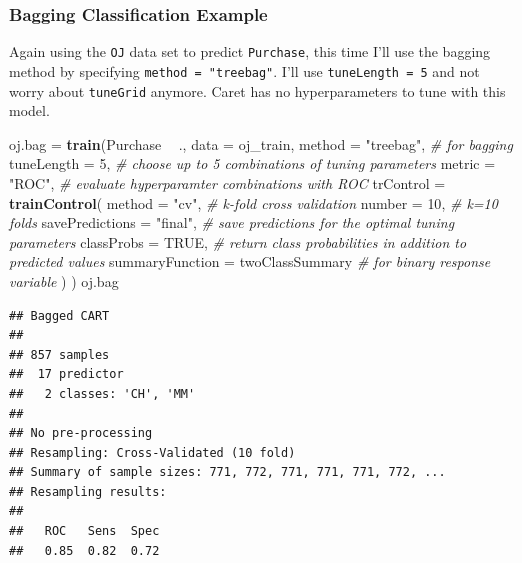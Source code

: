 \documentclass[
]{book}
\newenvironment{Shaded}{\begin{snugshade}}{\end{snugshade}}
\newcommand{\CommentTok}[1]{\textcolor[rgb]{0.56,0.35,0.01}{\textit{#1}}}
\newcommand{\DataTypeTok}[1]{\textcolor[rgb]{0.13,0.29,0.53}{#1}}
\newcommand{\DecValTok}[1]{\textcolor[rgb]{0.00,0.00,0.81}{#1}}
\newcommand{\KeywordTok}[1]{\textcolor[rgb]{0.13,0.29,0.53}{\textbf{#1}}}
\newcommand{\NormalTok}[1]{#1}
\newcommand{\OperatorTok}[1]{\textcolor[rgb]{0.81,0.36,0.00}{\textbf{#1}}}
\newcommand{\OtherTok}[1]{\textcolor[rgb]{0.56,0.35,0.01}{#1}}
\newcommand{\StringTok}[1]{\textcolor[rgb]{0.31,0.60,0.02}{#1}}
\begin{document}
\hypertarget{bagging-classification-example}{%
\subsubsection{Bagging Classification Example}\label{bagging-classification-example}}

Again using the \texttt{OJ} data set to predict \texttt{Purchase}, this time I'll use the bagging method by specifying \texttt{method\ =\ "treebag"}. I'll use \texttt{tuneLength\ =\ 5} and not worry about \texttt{tuneGrid} anymore. Caret has no hyperparameters to tune with this model.

\begin{Shaded}
\begin{Highlighting}[]
\NormalTok{oj.bag =}\StringTok{ }\KeywordTok{train}\NormalTok{(Purchase }\OperatorTok{~}\StringTok{ }\NormalTok{., }
               \DataTypeTok{data =}\NormalTok{ oj_train, }
               \DataTypeTok{method =} \StringTok{"treebag"}\NormalTok{,  }\CommentTok{# for bagging}
               \DataTypeTok{tuneLength =} \DecValTok{5}\NormalTok{,  }\CommentTok{# choose up to 5 combinations of tuning parameters}
               \DataTypeTok{metric =} \StringTok{"ROC"}\NormalTok{,  }\CommentTok{# evaluate hyperparamter combinations with ROC}
               \DataTypeTok{trControl =} \KeywordTok{trainControl}\NormalTok{(}
                 \DataTypeTok{method =} \StringTok{"cv"}\NormalTok{,  }\CommentTok{# k-fold cross validation}
                 \DataTypeTok{number =} \DecValTok{10}\NormalTok{,  }\CommentTok{# k=10 folds}
                 \DataTypeTok{savePredictions =} \StringTok{"final"}\NormalTok{,       }\CommentTok{# save predictions for the optimal tuning parameters}
                      \DataTypeTok{classProbs =} \OtherTok{TRUE}\NormalTok{,  }\CommentTok{# return class probabilities in addition to predicted values}
                      \DataTypeTok{summaryFunction =}\NormalTok{ twoClassSummary  }\CommentTok{# for binary response variable}
\NormalTok{                      )}
\NormalTok{                    )}
\NormalTok{oj.bag}
\end{Highlighting}
\end{Shaded}

\begin{verbatim}
## Bagged CART 
## 
## 857 samples
##  17 predictor
##   2 classes: 'CH', 'MM' 
## 
## No pre-processing
## Resampling: Cross-Validated (10 fold) 
## Summary of sample sizes: 771, 772, 771, 771, 771, 772, ... 
## Resampling results:
## 
##   ROC   Sens  Spec
##   0.85  0.82  0.72
\end{verbatim}
\end{document}
